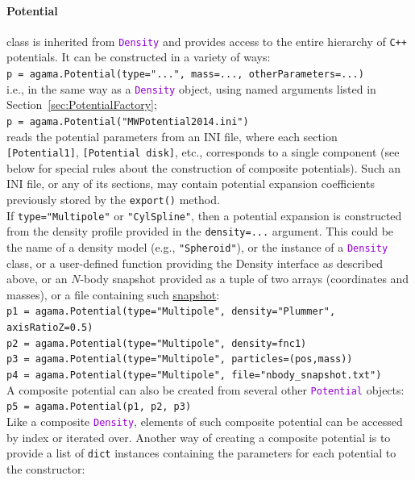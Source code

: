 \documentclass[12pt]{article}
\newcommand{\Cpp}  {\texttt{C++}\xspace}
\newcommand{\ttt}[1]{\textcolor{darkviolet}{\texttt{#1}}}
\newcommand{\ppp}[1]{\textcolor{darkolive} {\texttt{#1}}}
\begin{document}
\paragraph{Potential} class is inherited from \ttt{Density} and provides access to the entire hierarchy of \Cpp potentials. It can be constructed in a variety of ways: \\
\texttt{p = agama.Potential(type="...", mass=..., otherParameters=...)}\\
i.e., in the same way as a \ttt{Density} object, using named arguments listed in Section~\ref{sec:PotentialFactory};\\
\texttt{p = agama.Potential("MWPotential2014.ini")}\\
reads the potential parameters from an INI file, where each section \ppp{[Potential1]}, \ppp{[Potential disk]}, etc., corresponds to a single component (see below for special rules about the construction of composite potentials). Such an INI file, or any of its sections, may contain potential expansion coefficients previously stored by the \texttt{export()} method. \\[2mm]
If \ppp{type="Multipole"} or \ppp{"CylSpline"}, then a potential expansion is constructed from the density profile provided in the \ppp{density=...} argument. This could be the name of a density model (e.g., \ppp{"Spheroid"}), or the instance of a \ttt{Density} class, or a user-defined function providing the Density interface as described above, or an $N$-body snapshot provided as a tuple of two arrays (coordinates and masses), or a file containing such \hyperref[sec:PythonSnapshot]{snapshot}:\\
\texttt{p1 = agama.Potential(type="Multipole", density="Plummer", axisRatioZ=0.5)}\\
\texttt{p2 = agama.Potential(type="Multipole", density=fnc1)}\\
\texttt{p3 = agama.Potential(type="Multipole", particles=(pos,mass))}\\
\texttt{p4 = agama.Potential(type="Multipole", file="nbody_snapshot.txt")}\\[2mm]
A composite potential can also be created from several other \ttt{Potential} objects:\\
\texttt{p5 = agama.Potential(p1, p2, p3)}\\[2mm]
Like a composite \ttt{Density}, elements of such composite potential can be accessed by index or iterated over.
Another way of creating a composite potential is to provide a list of \texttt{dict} instances containing the parameters for each potential to the constructor:\\
\end{document}
